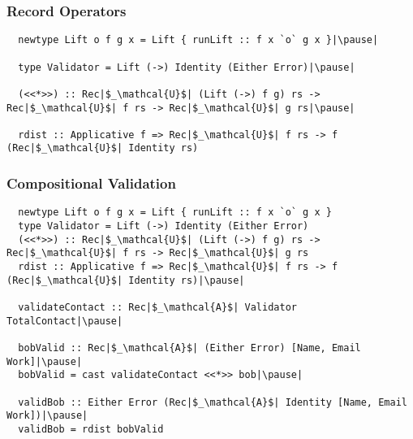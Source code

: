 \documentclass[tikz, 12pt]{beamer}
\begin{document}
\begin{frame}[fragile]
  \frametitle{Record Operators}\pause

  \begin{lstlisting}
  newtype Lift o f g x = Lift { runLift :: f x `o` g x }|\pause|

  type Validator = Lift (->) Identity (Either Error)|\pause|

  (<<*>>) :: Rec|$_\mathcal{U}$| (Lift (->) f g) rs -> Rec|$_\mathcal{U}$| f rs -> Rec|$_\mathcal{U}$| g rs|\pause|

  rdist :: Applicative f => Rec|$_\mathcal{U}$| f rs -> f (Rec|$_\mathcal{U}$| Identity rs)
  \end{lstlisting}
\end{frame}

\begin{frame}[fragile]
  \frametitle{Compositional Validation}

  \begin{lstlisting}
  newtype Lift o f g x = Lift { runLift :: f x `o` g x }
  type Validator = Lift (->) Identity (Either Error)
  (<<*>>) :: Rec|$_\mathcal{U}$| (Lift (->) f g) rs -> Rec|$_\mathcal{U}$| f rs -> Rec|$_\mathcal{U}$| g rs
  rdist :: Applicative f => Rec|$_\mathcal{U}$| f rs -> f (Rec|$_\mathcal{U}$| Identity rs)|\pause|

  validateContact :: Rec|$_\mathcal{A}$| Validator TotalContact|\pause|

  bobValid :: Rec|$_\mathcal{A}$| (Either Error) [Name, Email Work]|\pause|
  bobValid = cast validateContact <<*>> bob|\pause|

  validBob :: Either Error (Rec|$_\mathcal{A}$| Identity [Name, Email Work])|\pause|
  validBob = rdist bobValid
  \end{lstlisting}
\end{frame}
\end{document}
